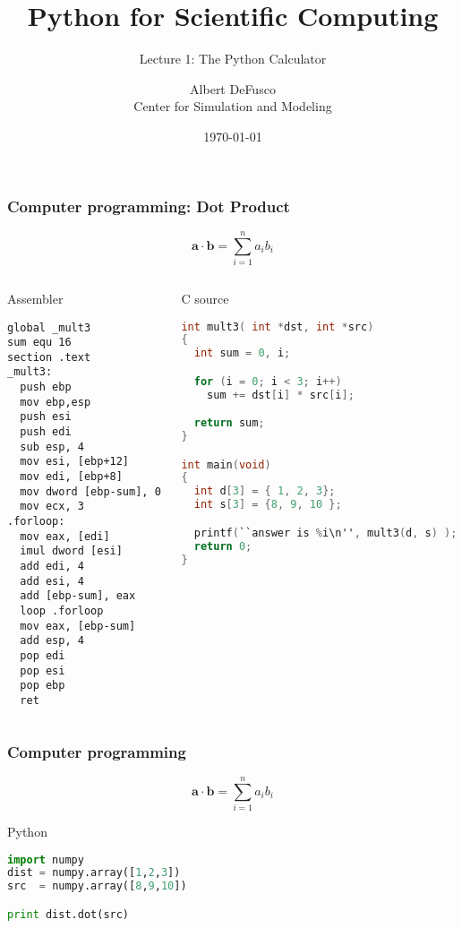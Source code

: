 \documentclass[xcolor=table,10pt,final]{beamer}
\begin{document}
\title{Python for Scientific Computing}
\subtitle{Lecture 1: The Python Calculator}
\author{Albert DeFusco\\Center for Simulation and Modeling}
\date{\today}
\frame{\titlepage}

\begin{frame}[fragile]
  \frametitle{Computer programming: Dot Product}
  {\scriptsize
  \begin{equation*}
    \mathbf{a}\cdot\mathbf{b} = \sum_{i=1}^{n}a_ib_i
  \end{equation*}
}
  \begin{columns}
    \begin{column}{0.5\paperwidth}
      \begin{block}{Assembler}
\lstset{
      basicstyle=\tiny
    }
  \begin{lstlisting}[language={[x86masm]Assembler}]
global _mult3
sum equ 16
section .text
_mult3:
  push ebp
  mov ebp,esp
  push esi
  push edi
  sub esp, 4
  mov esi, [ebp+12]
  mov edi, [ebp+8]
  mov dword [ebp-sum], 0
  mov ecx, 3
.forloop:
  mov eax, [edi]
  imul dword [esi]
  add edi, 4
  add esi, 4
  add [ebp-sum], eax
  loop .forloop
  mov eax, [ebp-sum]
  add esp, 4
  pop edi
  pop esi
  pop ebp
  ret
\end{lstlisting}
\end{block}
\end{column}
\begin{column}{0.35\paperwidth}
  \begin{block}{C source\footnotemark}
\lstset{
      basicstyle=\tiny
    }
  \begin{lstlisting}[language=C]
int mult3( int *dst, int *src)
{
  int sum = 0, i;

  for (i = 0; i < 3; i++)
    sum += dst[i] * src[i];

  return sum;
}

int main(void)
{
  int d[3] = { 1, 2, 3};
  int s[3] = {8, 9, 10 };

  printf(``answer is %i\n'', mult3(d, s) );
  return 0;
}
      \end{lstlisting}
    \end{block}
    \end{column}
  \end{columns}
  {\tiny {}}
\end{frame}
\begin{frame}[fragile]
  \frametitle{Computer programming}
  {\scriptsize
  \begin{equation*}
    \mathbf{a}\cdot\mathbf{b} = \sum_{i=1}^{n}a_ib_i
  \end{equation*}
}
\lstset{
      basicstyle=\footnotesize
    }
  \begin{block}{Python}
    \begin{lstlisting}[language=Python]
import numpy
dist = numpy.array([1,2,3])
src  = numpy.array([8,9,10])

print dist.dot(src)
\end{lstlisting}
\end{block}
\end{frame}
\end{document}
